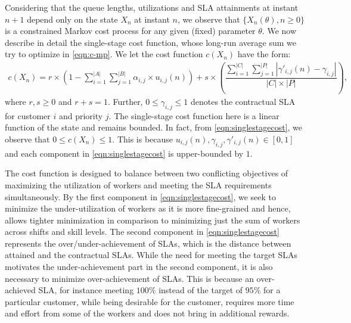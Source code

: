 \documentclass[11pt,letterpaper,english]{article}
\begin{document}
Considering that the queue lengths, utilizations and SLA attainments at instant
$n+1$ depend only on the state $X_n$ at instant $n$, we
observe that $\{X_n(\theta), n \ge 0\}$ is a constrained 
Markov cost process for any given (fixed) parameter $\theta$.
We now describe in detail the single-stage cost function, whose long-run average sum we try to optimize in \eqref{eqn:c-mp}.
We let the cost function $c(X_n)$ have the form:
\begin{equation}
\label{eqn:singlestagecost}
\begin{array}{l}
c(X_n)  =    r \times \left( 1 -  \sum_{i=1}^{|A|}\sum_{j=1}^{|B|} \alpha_{i,j} \times u_{i,j}(n) \right) + s \times \left( \dfrac{\sum_{i=1}^{|C|}\sum_{j=1}^{|P|} \left | \gamma'_{i,j}(n) - \gamma_{i,j} \right |}{|C|\times|P|}\right),
\end{array}
\end{equation}
where $r,s \ge 0$ and $r + s =1$. Further, $0 \le \gamma_{i, j} \le 1$ denotes the contractual SLA for customer $i$ and priority $j$. The single-stage cost function here is a linear function of the state and remains bounded. In fact, from \eqref{eqn:singlestagecost}, we observe that $0 \le c(X_n) \le 1$. This is because $u_{i,j}(n), \gamma_{i,j}, \gamma'_{i,j}(n) \in [0,1]$ and each component in \eqref{eqn:singlestagecost} is upper-bounded by $1$.

The cost function is designed to balance between two conflicting objectives of maximizing the utilization of workers and meeting the SLA requirements simultaneously.
By the first component in \eqref{eqn:singlestagecost}, we seek to minimize the under-utilization of workers as it is more fine-grained and hence, allows tighter minimization in comparison to minimizing just the sum of workers across shifts and skill levels. The second component in \eqref{eqn:singlestagecost} represents the over/under-achievement of SLAs, which is the distance between attained and the contractual SLAs. While the need for meeting the target SLAs motivates the under-achievement part in the second component, it is also necessary to minimize over-achievement of SLAs. This is because an over-achieved SLA, for instance meeting $100\%$ instead of the target of $95\%$ for a particular customer, while being desirable for the customer,
requires more time and effort from some of the workers and does not bring in additional rewards.
\end{document}
